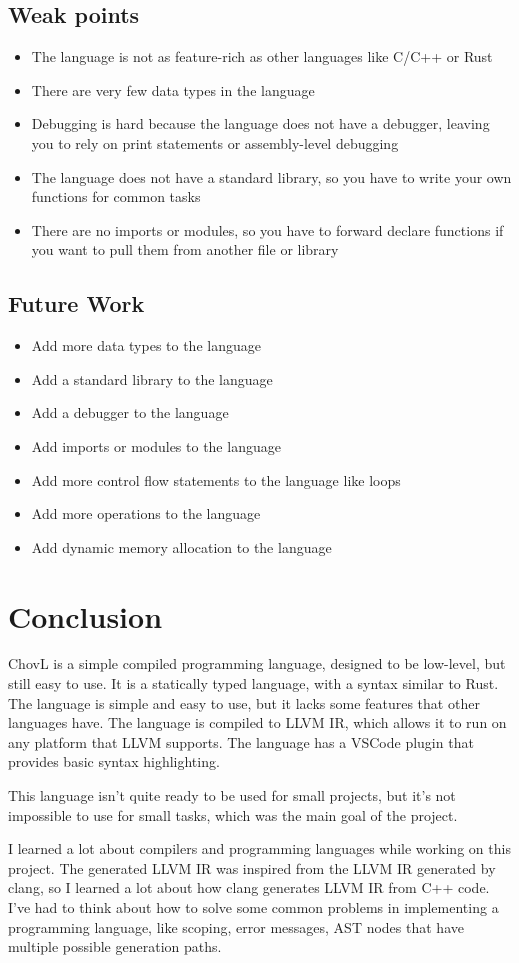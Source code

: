 \subsection{Weak points}
\begin{itemize}
  \item The language is not as feature-rich as other languages like C/C++ or Rust
  \item There are very few data types in the language
  \item Debugging is hard because the language does not have a debugger, leaving you to rely on print statements or assembly-level debugging
  \item The language does not have a standard library, so you have to write your own functions for common tasks
  \item There are no imports or modules, so you have to forward declare functions if you want to pull them from another file or library
\end{itemize}

\subsection{Future Work}
\begin{itemize}
  \item Add more data types to the language
  \item Add a standard library to the language
  \item Add a debugger to the language
  \item Add imports or modules to the language
  \item Add more control flow statements to the language like loops
  \item Add more operations to the language
  \item Add dynamic memory allocation to the language
\end{itemize}

\section{Conclusion}
ChovL is a simple compiled programming language, designed to be low-level, but still easy to use. It is a statically typed language, with a syntax similar to Rust. The language is simple and easy to use, but it lacks some features that other languages have. The language is compiled to LLVM IR, which allows it to run on any platform that LLVM supports. The language has a VSCode plugin that provides basic syntax highlighting.

This language isn't quite ready to be used for small projects, but it's not impossible to use for small tasks, which was the main goal of the project.

I learned a lot about compilers and programming languages while working on this project. The generated LLVM IR was inspired from the LLVM IR generated by clang, so I learned a lot about how clang generates LLVM IR from C++ code. I've had to think about how to solve some common problems in implementing a programming language, like scoping, error messages, AST nodes that have multiple possible generation paths.